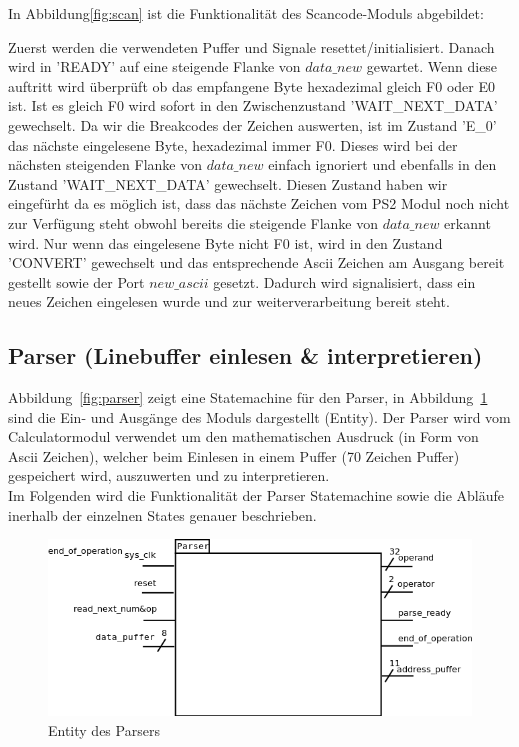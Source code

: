 In Abbildung\ref{fig:scan}  ist die Funktionalität des Scancode-Moduls abgebildet:

Zuerst werden die verwendeten Puffer und Signale resettet/initialisiert. Danach wird in 'READY' auf eine steigende Flanke von $data\_new$ gewartet. Wenn diese auftritt wird überprüft ob das empfangene Byte hexadezimal gleich F0 oder E0 ist. Ist es gleich F0 wird sofort in den Zwischenzustand 'WAIT\_NEXT\_DATA' gewechselt. Da wir die Breakcodes der Zeichen auswerten, ist im Zustand 'E\_0' das nächste eingelesene Byte, hexadezimal immer F0. Dieses wird bei der nächsten steigenden Flanke von $data\_new$ einfach ignoriert und ebenfalls in den Zustand 'WAIT\_NEXT\_DATA' gewechselt.
Diesen Zustand haben wir eingefürht da es möglich ist, dass das nächste Zeichen vom PS2 Modul noch nicht zur Verfügung steht obwohl bereits die steigende Flanke von $data\_new$ erkannt wird.
Nur wenn das eingelesene Byte nicht F0 ist, wird in den Zustand 'CONVERT' gewechselt und das entsprechende Ascii Zeichen am Ausgang bereit gestellt sowie der Port $new\_ascii$ gesetzt. Dadurch wird signalisiert, dass ein neues Zeichen eingelesen wurde und zur weiterverarbeitung bereit steht.  


\subsection{Parser (Linebuffer einlesen \& interpretieren)}

Abbildung~\ref{fig:parser} zeigt eine Statemachine für den Parser, in Abbildung~\ref{fig:entity_parser} sind die Ein- und Ausgänge des Moduls dargestellt (Entity). Der Parser wird vom Calculatormodul verwendet um den mathematischen Ausdruck (in Form von Ascii Zeichen), welcher beim Einlesen in einem Puffer (70 Zeichen Puffer) gespeichert wird, auszuwerten und zu interpretieren. \\
Im Folgenden wird die Funktionalität der Parser Statemachine sowie die Abläufe inerhalb der einzelnen States genauer beschrieben.

\begin{figure}[!ht]
	\centering
	\includegraphics[scale=0.5]{figures/entity_parser.png} 
	\caption{Entity des Parsers}
	\label{fig:entity_parser}
\end{figure}


